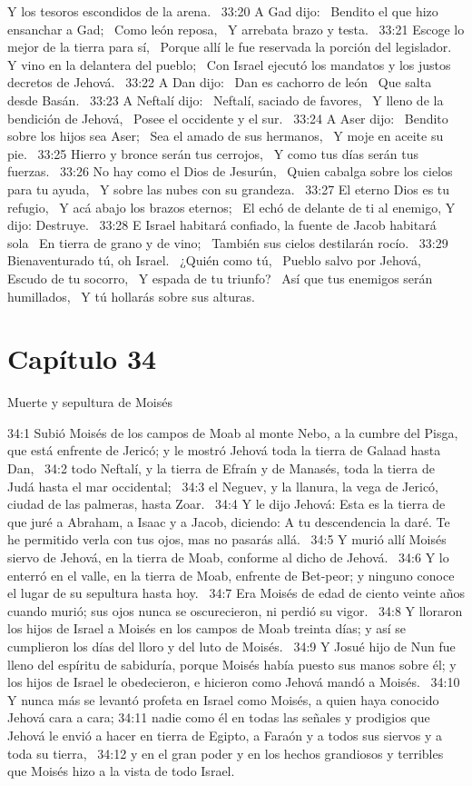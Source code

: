 Y los tesoros escondidos de la arena.  
33:20 A Gad dijo:  
Bendito el que hizo ensanchar a Gad;  
Como león reposa,  
Y arrebata brazo y testa.  
33:21 Escoge lo mejor de la tierra para sí,  
Porque allí le fue reservada la porción del legislador.  
Y vino en la delantera del pueblo;  
Con Israel ejecutó los mandatos y los justos decretos de Jehová.  
33:22 A Dan dijo:  
Dan es cachorro de león  
Que salta desde Basán.  
33:23 A Neftalí dijo:  
Neftalí, saciado de favores,  
Y lleno de la bendición de Jehová,  
Posee el occidente y el sur.  
33:24 A Aser dijo:  
Bendito sobre los hijos sea Aser;  
Sea el amado de sus hermanos,  
Y moje en aceite su pie.  
33:25 Hierro y bronce serán tus cerrojos,  
Y como tus días serán tus fuerzas.  
33:26 No hay como el Dios de Jesurún,  
Quien cabalga sobre los cielos para tu ayuda,  
Y sobre las nubes con su grandeza.  
33:27 El eterno Dios es tu refugio,  
Y acá abajo los brazos eternos;  
El echó de delante de ti al enemigo, 
Y dijo: Destruye.  
33:28 E Israel habitará confiado, la fuente de Jacob habitará sola  
En tierra de grano y de vino;  
También sus cielos destilarán rocío.  
33:29 Bienaventurado tú, oh Israel.  
¿Quién como tú,  
Pueblo salvo por Jehová,  
Escudo de tu socorro,  
Y espada de tu triunfo?  
Así que tus enemigos serán humillados,  
Y tú hollarás sobre sus alturas.  
\section*{Capítulo 34 }
Muerte y sepultura de Moisés  

34:1 Subió Moisés de los campos de Moab al monte Nebo, a la cumbre del Pisga, que está enfrente de Jericó; y le mostró Jehová toda la tierra de Galaad hasta Dan,  
34:2 todo Neftalí, y la tierra de Efraín y de Manasés, toda la tierra de Judá hasta el mar occidental;  
34:3 el Neguev, y la llanura, la vega de Jericó, ciudad de las palmeras, hasta Zoar.  
34:4 Y le dijo Jehová: Esta es la tierra de que juré a Abraham, a Isaac y a Jacob, diciendo: A tu descendencia la daré. Te he permitido verla con tus ojos, mas no pasarás allá.  
34:5 Y murió allí Moisés siervo de Jehová, en la tierra de Moab, conforme al dicho de Jehová.  
34:6 Y lo enterró en el valle, en la tierra de Moab, enfrente de Bet-peor; y ninguno conoce el lugar de su sepultura hasta hoy.  
34:7 Era Moisés de edad de ciento veinte años cuando murió; sus ojos nunca se oscurecieron, ni perdió su vigor.  
34:8 Y lloraron los hijos de Israel a Moisés en los campos de Moab treinta días; y así se cumplieron los días del lloro y del luto de Moisés.  
34:9 Y Josué hijo de Nun fue lleno del espíritu de sabiduría, porque Moisés había puesto sus manos sobre él; y los hijos de Israel le obedecieron, e hicieron como Jehová mandó a Moisés.  
34:10 Y nunca más se levantó profeta en Israel como Moisés, a quien haya conocido Jehová cara a cara; 
34:11 nadie como él en todas las señales y prodigios que Jehová le envió a hacer en tierra de Egipto, a Faraón y a todos sus siervos y a toda su tierra,  
34:12 y en el gran poder y en los hechos grandiosos y terribles que Moisés hizo a la vista de todo Israel.
